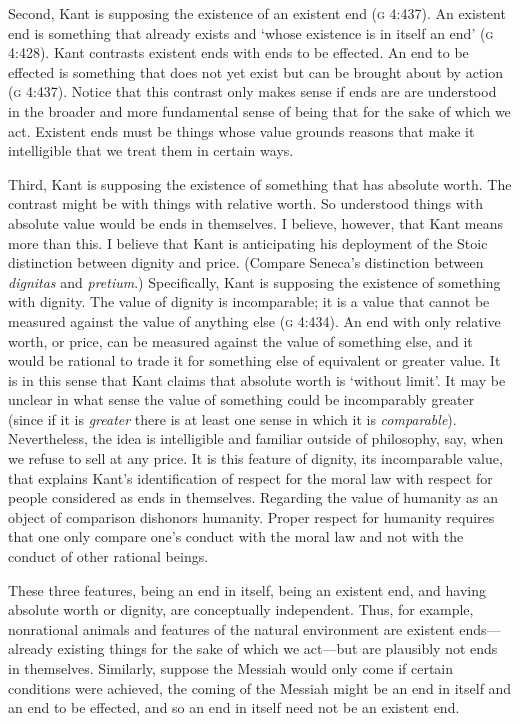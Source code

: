 \documentclass[12pt]{article}
\begin{document}
Second, Kant is supposing the existence of an existent end (\textsc{g} 4:437). An existent end is something that already exists and `whose existence is in itself an end' (\textsc{g} 4:428). Kant contrasts existent ends with ends to be effected. An end to be effected is something that does not yet exist but can be brought about by action (\textsc{g} 4:437). Notice that this contrast only makes sense if ends are are understood in the broader and more fundamental sense of being that for the sake of which we act. Existent ends must be things whose value grounds reasons that make it intelligible that we treat them in certain ways.

Third, Kant is supposing the existence of something that has absolute worth. The contrast might be with things with relative worth. So understood things with absolute value would be ends in themselves. I believe, however, that Kant means more than this. I believe that Kant is anticipating his deployment of the Stoic distinction between dignity and price. (Compare Seneca's distinction between \emph{dignitas} and \emph{pretium}.) Specifically, Kant is supposing the existence of something with dignity. The value of dignity is incomparable; it is a value that cannot be measured against the value of anything else (\textsc{g} 4:434). An end with only relative worth, or price, can be measured against the value of something else, and it would be rational to trade it for something else of equivalent or greater value. It is in this sense that Kant claims that absolute worth is `without limit'. It may be unclear in what sense the value of something could be incomparably greater (since if it is \emph{greater} there is at least one sense in which it is \emph{comparable}). Nevertheless, the idea is intelligible and familiar outside of philosophy, say, when we refuse to sell at any price. It is this feature of dignity, its incomparable value, that explains Kant's identification of respect for the moral law with respect for people considered as ends in themselves. Regarding the value of humanity as an object of comparison dishonors humanity. Proper respect for humanity requires that one only compare one's conduct with the moral law and not with the conduct of other rational beings.

These three features, being an end in itself, being an existent end, and having absolute worth or dignity, are conceptually independent. Thus, for example, nonrational animals and features of the natural environment are existent ends---already existing things for the sake of which we act---but are plausibly not ends in themselves. Similarly, suppose the Messiah would only come if certain conditions were achieved, the coming of the Messiah might be an end in itself and an end to be effected, and so an end in itself need not be an existent end. 
\end{document}
